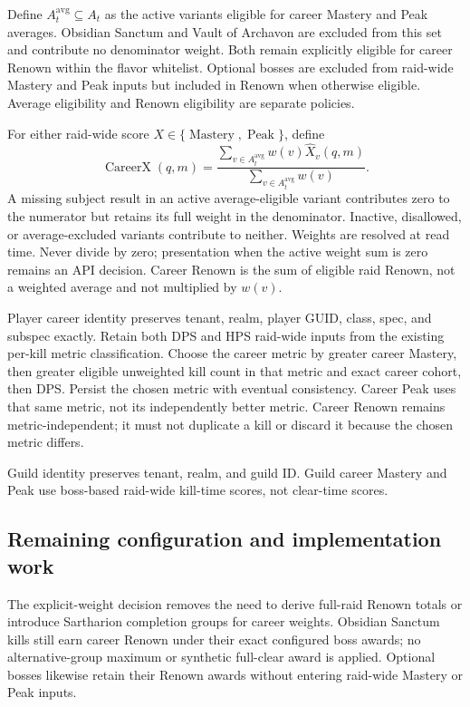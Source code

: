 \documentclass[11pt]{article}
\begin{document}
Define $A_t^{\mathrm{avg}}\subseteq A_t$ as the active variants eligible for career Mastery and Peak averages. Obsidian Sanctum and Vault of Archavon are excluded from this set and contribute no denominator weight. Both remain explicitly eligible for career Renown within the flavor whitelist. Optional bosses are excluded from raid-wide Mastery and Peak inputs but included in Renown when otherwise eligible. Average eligibility and Renown eligibility are separate policies.

For either raid-wide score $X\in\{\operatorname{Mastery},\operatorname{Peak}\}$, define
\[
 \operatorname{CareerX}(q,m)=
 \frac{\sum_{v\in A_t^{\mathrm{avg}}}w(v)\widehat{X}_v(q,m)}
      {\sum_{v\in A_t^{\mathrm{avg}}}w(v)}.
\]
A missing subject result in an active average-eligible variant contributes zero to the numerator but retains its full weight in the denominator. Inactive, disallowed, or average-excluded variants contribute to neither. Weights are resolved at read time. Never divide by zero; presentation when the active weight sum is zero remains an API decision. Career Renown is the sum of eligible raid Renown, not a weighted average and not multiplied by $w(v)$.

Player career identity preserves tenant, realm, player GUID, class, spec, and subspec exactly. Retain both DPS and HPS raid-wide inputs from the existing per-kill metric classification. Choose the career metric by greater career Mastery, then greater eligible unweighted kill count in that metric and exact career cohort, then DPS. Persist the chosen metric with eventual consistency. Career Peak uses that same metric, not its independently better metric. Career Renown remains metric-independent; it must not duplicate a kill or discard it because the chosen metric differs.

Guild identity preserves tenant, realm, and guild ID. Guild career Mastery and Peak use boss-based raid-wide kill-time scores, not clear-time scores.

\subsection{Remaining configuration and implementation work}
The explicit-weight decision removes the need to derive full-raid Renown totals or introduce Sartharion completion groups for career weights. Obsidian Sanctum kills still earn career Renown under their exact configured boss awards; no alternative-group maximum or synthetic full-clear award is applied. Optional bosses likewise retain their Renown awards without entering raid-wide Mastery or Peak inputs.
\end{document}
